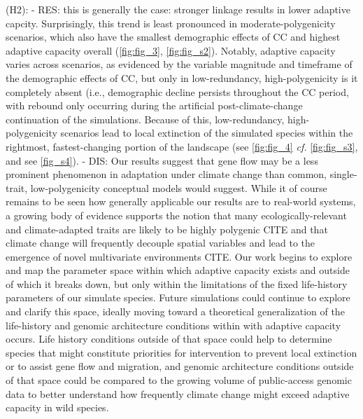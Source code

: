 \documentclass[9pt,twocolumn,twoside,lineno]{pnas-new}
\begin{document}
    (H2):
      - RES: this is generally the case: stronger linkage results in lower adaptive capcity. Surprisingly, this trend is least pronounced in moderate-polygenicity scenarios, which also have the smallest demographic effects of CC and highest adaptive capacity overall (\ref{fig:fig_3}, \ref{fig:fig_s2}). Notably, adaptive capacity varies across scenarios, as evidenced by the variable magnitude and timeframe of the demographic effects of CC, but only in low-redundancy, high-polygenicity is it completely absent (i.e., demographic decline persists throughout the CC period, with rebound only occurring during the artificial post-climate-change continuation of the simulations. Because of this, low-redundancy, high-polygenicity scenarios lead to local extinction of the simulated species within the rightmost, fastest-changing portion of the landscape (see \ref{fig:fig_4} \textit{cf.} \ref{fig:fig_s3}, and see \ref{fig_s4}).
      - DIS: Our results suggest that gene flow may be a less prominent phenomenon in adaptation under climate change than common, single-trait, low-polygenicity conceptual models would suggest. While it of course remains to be seen how generally applicable our results are to real-world systems, a growing body of evidence supports the notion that many ecologically-relevant and climate-adapted traits are likely to be highly polygenic CITE and that climate change will frequently decouple spatial variables and lead to the emergence of novel multivariate environments CITE. Our work begins to explore and map the parameter space within which adaptive capacity exists and outside of which it breaks down, but only within the limitations of the fixed life-history parameters of our simulate species. Future simulations could continue to explore and clarify this space, ideally moving toward a theoretical generalization of the life-history and genomic architecture conditions within with adaptive capacity occurs. Life history conditions outside of that space could help to determine species that might constitute priorities for intervention to prevent local extinction or to assist gene flow and migration, and genomic architecture conditions outside of that space could be compared to the growing volume of public-access genomic data to better understand how frequently climate change might exceed adaptive capacity in wild species.
      
\end{document}
